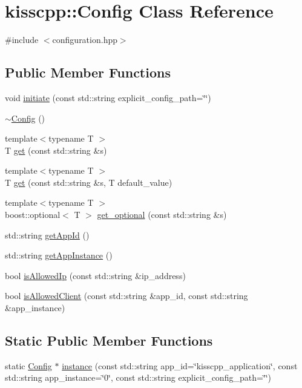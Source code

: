 \hypertarget{a00021}{\section{kisscpp\-:\-:Config Class Reference}
\label{a00021}
}


{\ttfamily \#include $<$configuration.\-hpp$>$}

\subsection*{Public Member Functions}
\begin{DoxyCompactItemize}
\item 
void \hyperlink{a00021_a3d46f787270d6aeac04635c04936c404}{initiate} (const std\-::string explicit\-\_\-config\-\_\-path=\char`\"{}\char`\"{})
\item 
\hyperlink{a00021_ae6fd9d0a11285f8dd5658bf07f728e01}{$\sim$\-Config} ()
\item 
{\footnotesize template$<$typename T $>$ }\\T \hyperlink{a00021_ae237509831f23cd9cbfc67dcd6ed8c9d}{get} (const std\-::string \&s)
\item 
{\footnotesize template$<$typename T $>$ }\\T \hyperlink{a00021_a747baa092e702cb9a42f9c4c74958ddd}{get} (const std\-::string \&s, T default\-\_\-value)
\item 
{\footnotesize template$<$typename T $>$ }\\boost\-::optional$<$ T $>$ \hyperlink{a00021_a0b0267e59a04df930282c0b39e7f79dd}{get\-\_\-optional} (const std\-::string \&s)
\item 
std\-::string \hyperlink{a00021_a5f970e234e909ccb7b18bf4e7705e336}{get\-App\-Id} ()
\item 
std\-::string \hyperlink{a00021_a9a68e47e345ee1fa208397f1c19859f2}{get\-App\-Instance} ()
\item 
bool \hyperlink{a00021_a9b6825f6980d6caa4780567936ce77a6}{is\-Allowed\-Ip} (const std\-::string \&ip\-\_\-address)
\item 
bool \hyperlink{a00021_afb8591ec6e7e7cd86e151f45c7c8ba3b}{is\-Allowed\-Client} (const std\-::string \&app\-\_\-id, const std\-::string \&app\-\_\-instance)
\end{DoxyCompactItemize}
\subsection*{Static Public Member Functions}
\begin{DoxyCompactItemize}
\item 
static \hyperlink{a00021}{Config} $\ast$ \hyperlink{a00021_a235cf3d03c1211faa29efa63556921fc}{instance} (const std\-::string app\-\_\-id=\char`\"{}kisscpp\-\_\-application\char`\"{}, const std\-::string app\-\_\-instance=\char`\"{}0\char`\"{}, const std\-::string explicit\-\_\-config\-\_\-path=\char`\"{}\char`\"{})
\end{DoxyCompactItemize}


